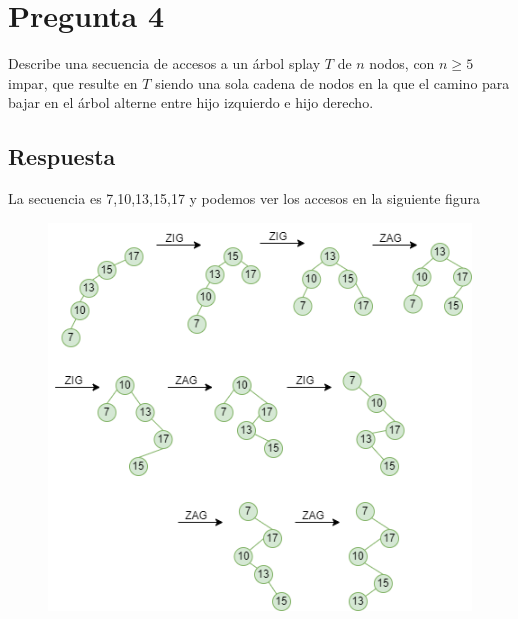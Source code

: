 \section*{Pregunta 4}
\noindent Describe una secuencia de accesos a un árbol splay $T$ de $n$ nodos, con $n \geq 5$ impar, que resulte en $T$ siendo una sola cadena de nodos en la que el camino para bajar en el árbol alterne entre hijo izquierdo e hijo derecho.

\subsection*{Respuesta}

La secuencia es 7,10,13,15,17 y podemos ver los accesos en la siguiente figura
\begin{figure}
    \centering
    \includegraphics[width=\textwidth]{t1-4.png}
\end{figure}

\bigskip
